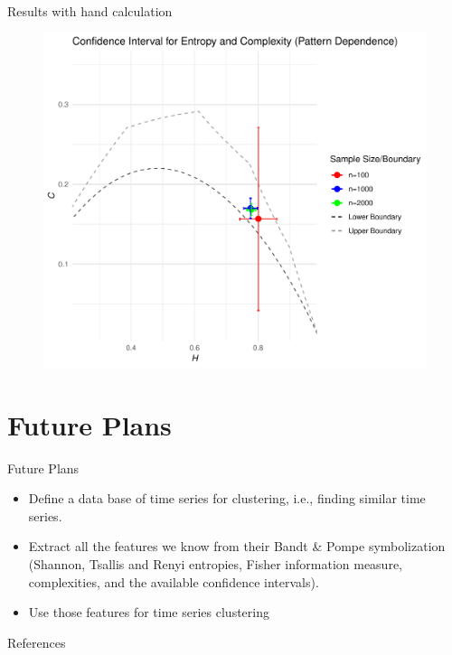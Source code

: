 \documentclass{beamer}
\begin{document}
\begin{frame}{Results with hand calculation}
	\begin{figure}[hbt]
		\centering
		\includegraphics[width=0.8 \textwidth]{CI for pattern dependence}
		\end{figure}
\end{frame}


\section{Future Plans}

\begin{frame}{Future Plans}
    \begin{itemize}
        \item Define a data base of time series for clustering, i.e., finding similar time series.
        \item Extract all the features we know from their Bandt \& Pompe symbolization (Shannon, Tsallis and Renyi entropies, Fisher information measure, complexities, and the available confidence intervals).
        \item Use those features for time series clustering
    \end{itemize}
\end{frame}

\begin{frame}[allowframebreaks]{References}
    
    
    
\end{frame}
\end{document}
